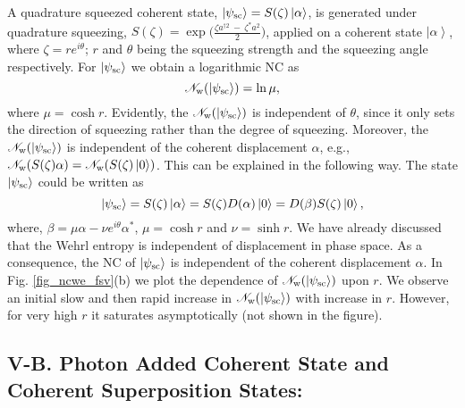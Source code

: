 \documentclass[letter,scriptaddress,twocolumn,prl,showkeys]{revtex4}
\newcommand{\ket}[1]{\left| #1 \right\rangle}
\begin{document}
A quadrature squeezed coherent state, $\ket {\psi_{\rm{sc}}}=S(\zeta)\ket\alpha$, is generated under quadrature squeezing, $S(\zeta)=\exp\big( \frac{\zeta a^{\dagger 2}~-~\zeta^{*}a^{2}}{2}\big)$, applied on a coherent state $\ket\alpha$, where $\zeta=r e^{i\theta}$; $r$ and $\theta$ being the squeezing strength and the squeezing angle respectively. 
For $\ket {\psi_{\rm{sc}}}$ we obtain a logarithmic NC as
\begin{equation}
\mathscr{N}_{\rm{w}}(\ket {\psi_{\rm{sc}}})=\ln \mu,
\label{eq_meas_ncwe_sc}
\end{equation}
where $\mu = \cosh r$. 
Evidently, the $\mathscr{N}_{\rm{w}}(\ket {\psi_{\rm{sc}}})$ is independent of $\theta$, since it only sets the direction of squeezing rather than the degree of squeezing. 
Moreover, the $\mathscr{N}_{\rm{w}}(\ket {\psi_{\rm{sc}}})$ is independent of the coherent displacement $\alpha$, e.g., $\mathscr{N}_{\rm{w}}(S(\zeta)\alpha)=\mathscr{N}_{\rm{w}}(S(\zeta)\ket 0)$. 
This can be explained in the following way. 
The state $\ket {\psi_{\rm{sc}}}$ could be written as
\begin{equation}
\ket {\psi_{\rm{sc}}}= S(\zeta)\ket\alpha= S(\zeta)D(\alpha)\ket 0= D(\beta)S(\zeta)\ket 0,
\end{equation} 
where, $\beta=\mu\alpha-\nu e^{i\theta}\alpha^{*}$, $\mu=\cosh r$ and $\nu=\sinh r$.
We have already discussed that the Wehrl entropy is independent of displacement in phase space.
As a consequence, the NC of $\ket {\psi_{\rm{sc}}}$ is independent of the coherent displacement $\alpha$. 
In Fig. \ref{fig_ncwe_fsv}(b) we plot the dependence of $\mathscr{N}_{\rm{w}}(\ket {\psi_{\rm{sc}}})$ upon $r$. 
We observe an initial slow and then rapid increase in $\mathscr{N}_{\rm{w}}(\ket {\psi_{\rm{sc}}})$ with increase in $r$. 
However, for very high $r$ it saturates asymptotically (not shown in the figure).

\subsection*{V-B. Photon Added Coherent State and Coherent Superposition States:}
\end{document}
